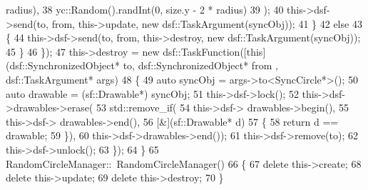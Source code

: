 \begin{DoxyCodeInclude}
      radius),
38                                                                       yc::Random().randInt(0, size.y - 2 * 
      radius)
39                                                                       );
40                                                  this->dsf->send(to, from, this->update, \textcolor{keyword}{new} 
      dsf::TaskArgument(syncObj));
41                                              \}
42                                              \textcolor{keywordflow}{else}
43                                              \{
44                                                  this->dsf->send(to, from, this->destroy, \textcolor{keyword}{new} 
      dsf::TaskArgument(syncObj));
45                                              \}
46                                          \});
47     this->destroy = \textcolor{keyword}{new} dsf::TaskFunction([\textcolor{keyword}{this}](dsf::SynchronizedObject* to, dsf::SynchronizedObject* from
      , dsf::TaskArgument* args)
48                                           \{
49                                               \textcolor{keyword}{auto} syncObj = args->to<SyncCircle*>();
50                                               \textcolor{keyword}{auto} drawable = (sf::Drawable*) syncObj;
51                                               this->dsf->lock();
52                                               this->dsf->drawables->erase(
53                                                                           std::remove\_if(
54                                                                                          this->dsf->
      drawables->begin(),
55                                                                                          this->dsf->
      drawables->end(),
56                                                                                          [&](sf::Drawable* 
      d)
57                                                                                          \{
58                                                                                              \textcolor{keywordflow}{return} d == 
      drawable;
59                                                                                          \}),
60                                                                           this->dsf->drawables->end());
61                                               this->dsf->remove(to);
62                                               this->dsf->unlock();
63                                           \});
64 \}
65 RandomCircleManager::~RandomCircleManager()
66 \{
67     \textcolor{keyword}{delete} this->create;
68     \textcolor{keyword}{delete} this->update;
69     \textcolor{keyword}{delete} this->destroy;
70 \}
\end{DoxyCodeInclude}

